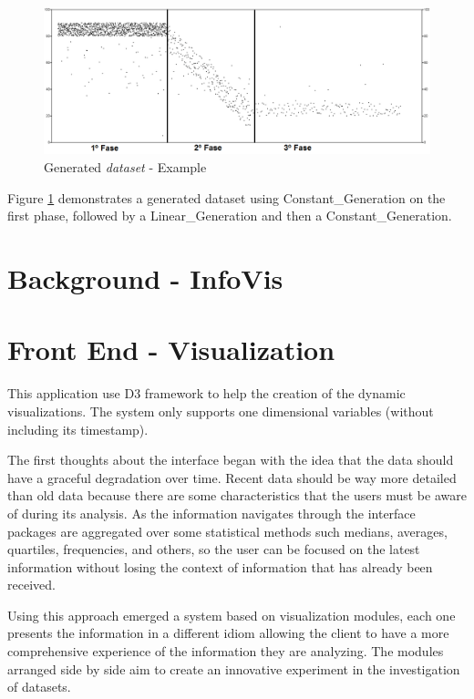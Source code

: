 \documentclass[letterpaper, 10 pt, conference]{ieeeconf}  %
\begin{document}
\begin{figure}[h]
    \centering
    \includegraphics[width=\linewidth]{Figures/exemplo_datageneration.png}
    \caption{Generated \textit{dataset} - Example}
        \label{fig:example_datageneration}
\end{figure}

Figure \ref{fig:example_datageneration} demonstrates a generated dataset using Constant\_Generation on the first phase, followed by a Linear\_Generation and then a Constant\_Generation.

\section{Background - InfoVis}
\label{section:background}

\section{Front End - Visualization}
\label{section:frontend}
This application use D3 framework \cite{2011-d3} to help the creation of the dynamic visualizations. The system only supports one dimensional variables (without including its timestamp). 

The first thoughts about the interface began with the idea that the data should have a graceful degradation over time. Recent data should be way more detailed than old data because there are some characteristics that the users must be aware of during its analysis. As the information navigates through the interface packages are aggregated over some statistical methods such medians, averages, quartiles, frequencies, and others, so the user can be focused on the latest information without losing the context of information that has already been received.

Using this approach emerged a system based on visualization modules, each one presents the information in a different idiom allowing the client to have a more comprehensive experience of the information they are analyzing. The modules arranged side by side aim to create an innovative experiment in the investigation of datasets.
\end{document}
